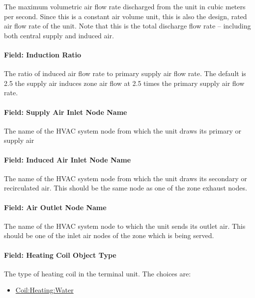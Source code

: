 The maximum volumetric air flow rate discharged from the unit in cubic meters per second. Since this is a constant air volume unit, this is also the design, rated air flow rate of the unit. Note that this is the total discharge flow rate -- including both central supply and induced air.

\paragraph{Field: Induction Ratio}\label{field-induction-ratio}

The ratio of induced air flow rate to primary supply air flow rate. The default is 2.5 the supply air induces zone air flow at 2.5 times the primary supply air flow rate.

\paragraph{Field: Supply Air Inlet Node Name}\label{field-supply-air-inlet-node-name-2}

The name of the HVAC system node from which the unit draws its primary or supply air

\paragraph{Field: Induced Air Inlet Node Name}\label{field-induced-air-inlet-node-name}

The name of the HVAC system node from which the unit draws its secondary or recirculated air. This should be the same node as one of the zone exhaust nodes.

\paragraph{Field: Air Outlet Node Name}\label{field-air-outlet-node-name-6}

The name of the HVAC system node to which the unit sends its outlet air. This should be one of the inlet air nodes of the zone which is being served.

\paragraph{Field: Heating Coil Object Type}\label{field-heating-coil-object-type-1}

The type of heating coil in the terminal unit. The choices are:

\begin{itemize}
\tightlist
\item
  \hyperref[coilheatingwater]{Coil:Heating:Water}
\end{itemize}

